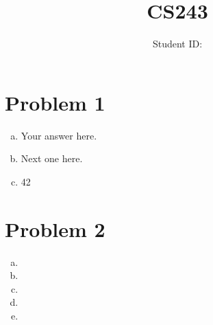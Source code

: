 \documentclass{article}
\title{CS243 \exerciseset}
\author{\studentname \qquad Student ID: \suid}
\begin{document}
\maketitle

\section*{Problem 1}
\begin{enumerate}[(a)]
\item %
Your answer here.

\item %
Next one here.

\item %
42

\end{enumerate}

\section*{Problem 2}
\begin{enumerate}[(a)]
\item %

\item %

\item %

\item %

\item %

\end{enumerate}
\end{document}
